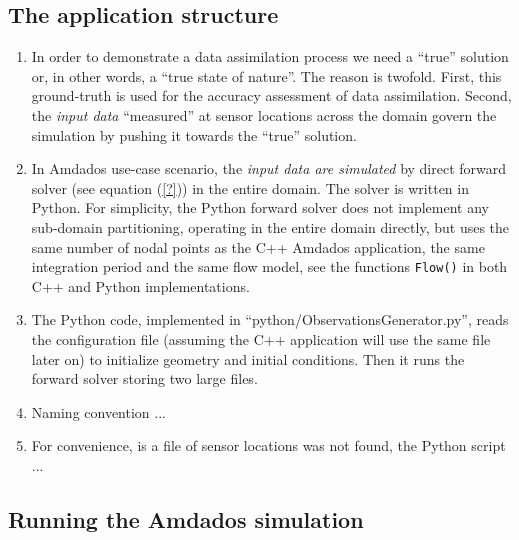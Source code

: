 \documentclass[]{article}
\begin{document}
\subsection{The application structure}
\begin{enumerate}
\item In order to demonstrate a data assimilation process we need a ``true'' solution or, in other words, a ``true state of nature''. The reason is twofold. First, this ground-truth is used for the accuracy assessment of data assimilation. Second, the \textit{input data} ``measured'' at sensor locations across the domain govern the simulation by pushing it towards the ``true'' solution.
\item In Amdados use-case scenario, the \textit{input data are simulated} by direct forward solver (see equation (\ref{?})) in the entire domain. The solver is written in Python. For simplicity, the Python forward solver does not implement any sub-domain partitioning, operating in the entire domain directly, but uses the same number of nodal points as the C++ Amdados application, the same integration period and the same flow model, see the functions \texttt{Flow()} in both C++ and Python implementations.
\item The Python code, implemented in ``python/ObservationsGenerator.py'', reads the configuration file (assuming the C++ application will use the same file later on) to initialize geometry and initial conditions. Then it runs the forward solver storing two large files.
\item Naming convention ...
\item For convenience, is a file of sensor locations was not found, the Python script ... 
\end{enumerate}

\subsection{Running the Amdados simulation}
\end{document}
